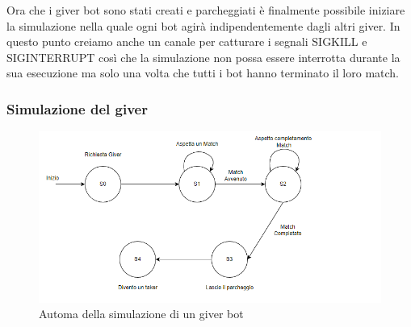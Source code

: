 \documentclass[main.tex]{subfiles}
\begin{document}

Ora che i giver bot sono stati creati e parcheggiati è finalmente possibile iniziare la simulazione nella quale ogni bot agirà indipendentemente dagli altri giver. \newline
In questo punto creiamo anche un canale per catturare i segnali SIGKILL e SIGINTERRUPT così che la simulazione non possa essere interrotta durante la sua esecuzione ma solo una volta che tutti i bot hanno terminato il loro match. \label{fig:giver start}

 


\subsubsection{Simulazione del giver}
\begin{figure}[H]
    \centering
    \includegraphics[width=1.2\linewidth]{img/simulazione/giverbot/giverBot-simulazione.png}
    \caption{Automa della simulazione di un giver bot }
    \label{fig:giverbot automa}
\end{figure}
\end{document}

